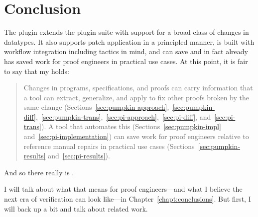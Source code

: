\section{Conclusion}
\label{sec:pi-concl}

The \toolnamec plugin extends the \sysnamelong plugin suite with support
for a broad class of changes in datatypes.
It also supports patch application in a principled manner,
is built with workflow integration including tactics in mind,
and can save and in fact already has saved work for proof engineers in practical use cases.
At this point, it is fair to say that my  holds:

\begin{quote}
Changes in programs, specifications, and proofs can carry information that a tool can extract, generalize, and apply to fix other proofs broken by the same change (Sections~\ref{sec:pumpkin-approach},~\ref{sec:pumpkin-diff},~\ref{sec:pumpkin-trans},~\ref{sec:pi-approach},~\ref{sec:pi-diff}, and~\ref{sec:pi-trans}). A tool that automates this (Sections~\ref{sec:pumpkin-impl} and~\ref{sec:pi-implementation}) can save work for proof engineers relative to reference manual repairs in 
practical use cases (Sections~\ref{sec:pumpkin-results} and~\ref{sec:pi-results}).
\end{quote}
And so there really is .

I will talk about what that means for proof engineers---and what I believe the next era of verification can look like---in Chapter~\ref{chapt:conclusions}.
But first, I will back up a bit and talk about related work.
